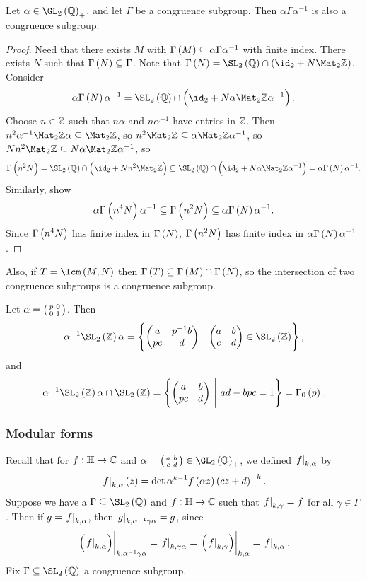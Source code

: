 \begin{proposition}
Let $ \alpha \in \GL_2\br{\QQ}_+ $, and let $ \Gamma $ be a congruence subgroup. Then $ \alpha\Gamma\alpha^{-1} $ is also a congruence subgroup.
\end{proposition}

\begin{proof}
Need that there exists $ M $ with $ \Gamma\br{M} \subseteq \alpha\Gamma\alpha^{-1} $ with finite index. There exists $ N $ such that $ \Gamma\br{N} \subseteq \Gamma $. Note that $ \Gamma\br{N} = \SL_2\br{\QQ} \cap \br{\id_2 + N\Mat_2 \ZZ} $. Consider
$$ \alpha\Gamma\br{N}\alpha^{-1} = \SL_2\br{\QQ} \cap \br{\id_2 + N\alpha\Mat_2 \ZZ\alpha^{-1}}. $$
Choose $ n \in \mathbb{Z} $ such that $ n\alpha $ and $ n\alpha^{-1} $ have entries in $ \mathbb{Z} $. Then $ n^2\alpha^{-1}\Mat_2 \ZZ\alpha \subseteq \Mat_2 \ZZ $, so $ n^2\Mat_2 \ZZ \subseteq \alpha\Mat_2 \ZZ\alpha^{-1} $, so $ Nn^2\Mat_2 \ZZ \subseteq N\alpha\Mat_2 \ZZ\alpha^{-1} $, so
$$ \Gamma\br{n^2N} = \SL_2\br{\QQ} \cap \br{\id_2 + Nn^2\Mat_2 \ZZ} \subseteq \SL_2\br{\QQ} \cap \br{\id_2 + N\alpha\Mat_2 \ZZ\alpha^{-1}} = \alpha\Gamma\br{N}\alpha^{-1}. $$
Similarly, show
$$ \alpha\Gamma\br{n^4N}\alpha^{-1} \subseteq \Gamma\br{n^2N} \subseteq \alpha\Gamma\br{N}\alpha^{-1}. $$
Since $ \Gamma\br{n^4N} $ has finite index in $ \Gamma\br{N} $, $ \Gamma\br{n^2N} $ has finite index in $ \alpha\Gamma\br{N}\alpha^{-1} $.
\end{proof}

\begin{note*}
Also, if $ T = \lcm\br{M, N} $ then $ \Gamma\br{T} \subseteq \Gamma\br{M} \cap \Gamma\br{N} $, so the intersection of two congruence subgroups is a congruence subgroup.
\end{note*}

\begin{example*}
Let $ \alpha = \begin{psmallmatrix} p & 0 \\ 0 & 1 \end{psmallmatrix} $. Then
$$ \alpha^{-1}\SL_2\br{\ZZ}\alpha = \cbr{\twobytwo{a}{p^{-1}b}{pc}{d} \st \twobytwo{a}{b}{c}{d} \in \SL_2\br{\ZZ}}, $$
and
$$ \alpha^{-1}\SL_2\br{\ZZ}\alpha \cap \SL_2\br{\ZZ} = \cbr{\twobytwo{a}{b}{pc}{d} \st ad - bpc = 1} = \Gamma_0\br{p}. $$
\end{example*}

\pagebreak

\subsubsection{Modular forms}

Recall that for $ f : \mathbb{H} \to \mathbb{C} $ and $ \alpha = \twobytwosmall{a}{b}{c}{d} \in \GL_2\br{\QQ}_+ $, we defined $ \left. f \right|_{k, \alpha} $ by
$$ \eval{f}_{k, \alpha}\br{z} = \det \alpha^{k - 1}f\br{\alpha z}\br{cz + d}^{-k}. $$
Suppose we have a $ \Gamma \subseteq \SL_2\br{\QQ} $ and $ f : \mathbb{H} \to \mathbb{C} $ such that $ \left. f \right|_{k, \gamma} = f $ for all $ \gamma \in \Gamma $. Then if $ g = \left. f \right|_{k, \alpha} $, then $ \left. g \right|_{k, \alpha^{-1}\gamma\alpha} = g $, since
$$ \eval{\br{\eval{f}_{k, \alpha}}}_{k, \alpha^{-1}\gamma\alpha} = \eval{f}_{k, \gamma\alpha} = \eval{\br{\eval{f}_{k, \gamma}}}_{k, \alpha} = \eval{f}_{k, \alpha}. $$
Fix $ \Gamma \subseteq \SL_2\br{\QQ} $ a congruence subgroup.

